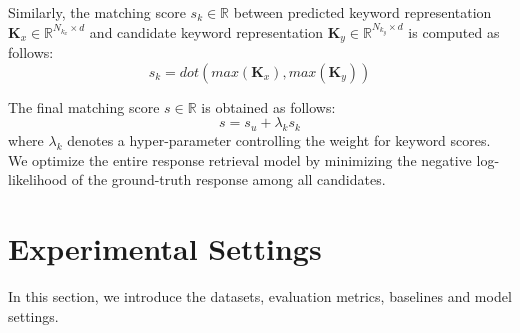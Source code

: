 \documentclass[letterpaper]{article} %
\begin{document}
Similarly, the matching score $s_k \in \mathbb{R}$ between predicted keyword representation $\mathbf{K}_x \in \mathbb{R}^{N_{k_x} \times d}$ and candidate keyword representation $\mathbf{K}_y \in \mathbb{R}^{N_{k_y} \times d}$ is computed as follows:
\begin{equation}
\label{eqn: keyword matching}
    s_k = \textit{dot}(\textit{max}(\mathbf{K}_x), \textit{max}(\mathbf{K}_y))
\end{equation}

The final matching score $s \in \mathbb{R}$ is obtained as follows:
\begin{equation}
\label{eqn: final matching}
    s = s_u + \lambda_k s_k
\end{equation}
where $\lambda_k$ denotes a hyper-parameter controlling the weight for keyword scores. We optimize the entire response retrieval model by minimizing the negative log-likelihood of the ground-truth response among all candidates.

\section{Experimental Settings}
\label{sec: experiments}
In this section, we introduce the datasets, evaluation metrics, baselines and model settings.
\end{document}
